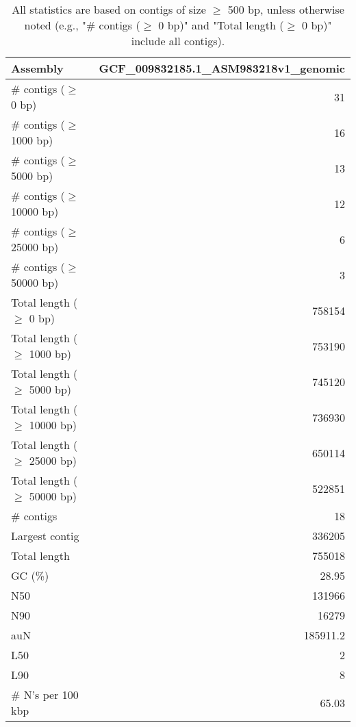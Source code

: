 \documentclass[12pt,a4paper]{article}
\begin{document}
\begin{table}[ht]
\begin{center}
\caption{All statistics are based on contigs of size $\geq$ 500 bp, unless otherwise noted (e.g., "\# contigs ($\geq$ 0 bp)" and "Total length ($\geq$ 0 bp)" include all contigs).}
\begin{tabular}{|l*{1}{|r}|}
\hline
Assembly & GCF\_009832185.1\_ASM983218v1\_genomic \\ \hline
\# contigs ($\geq$ 0 bp) & 31 \\ \hline
\# contigs ($\geq$ 1000 bp) & 16 \\ \hline
\# contigs ($\geq$ 5000 bp) & 13 \\ \hline
\# contigs ($\geq$ 10000 bp) & 12 \\ \hline
\# contigs ($\geq$ 25000 bp) & 6 \\ \hline
\# contigs ($\geq$ 50000 bp) & 3 \\ \hline
Total length ($\geq$ 0 bp) & 758154 \\ \hline
Total length ($\geq$ 1000 bp) & 753190 \\ \hline
Total length ($\geq$ 5000 bp) & 745120 \\ \hline
Total length ($\geq$ 10000 bp) & 736930 \\ \hline
Total length ($\geq$ 25000 bp) & 650114 \\ \hline
Total length ($\geq$ 50000 bp) & 522851 \\ \hline
\# contigs & 18 \\ \hline
Largest contig & 336205 \\ \hline
Total length & 755018 \\ \hline
GC (\%) & 28.95 \\ \hline
N50 & 131966 \\ \hline
N90 & 16279 \\ \hline
auN & 185911.2 \\ \hline
L50 & 2 \\ \hline
L90 & 8 \\ \hline
\# N's per 100 kbp & 65.03 \\ \hline
\end{tabular}
\end{center}
\end{table}
\end{document}
